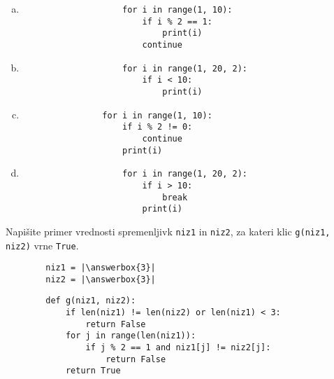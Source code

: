 \documentclass[arhiv, 10pt]{../izpit}
\newcommand{\inlinepy}[1]{\texttt{#1}}
\newcommand{\answerbox}[1]{\framebox{\vphantom{\large M}\hspace{#1cm}}}
\begin{document}
        \begin{multicols}{2}
        \begin{enumerate}[(a)]
\item 
                \begin{verbatim}
                    for i in range(1, 10):
                        if i % 2 == 1:
                            print(i)
                        continue
                \end{verbatim}
            
\item 
                \begin{verbatim}
                    for i in range(1, 20, 2):
                        if i < 10:
                            print(i)
                \end{verbatim}
            
\item 
            \begin{verbatim}
                for i in range(1, 10):
                    if i % 2 != 0:
                        continue
                    print(i)
            \end{verbatim}
        
\item 
                \begin{verbatim}
                    for i in range(1, 20, 2):
                        if i > 10:
                            break
                        print(i)
                \end{verbatim}
            
\end{enumerate}

        \end{multicols}
    
        \naloga*
        \begin{multicols}{2}
        \noindent
        Napišite primer vrednosti spremenljivk \inlinepy{niz1} in \inlinepy{niz2}, za kateri klic \inlinepy{g(niz1, niz2)} vrne \inlinepy{True}.
        \begin{verbatim}
        niz1 = |\answerbox{3}|
        niz2 = |\answerbox{3}|
        \end{verbatim}
        \vfil
        \columnbreak
        \begin{verbatim}
        def g(niz1, niz2):
            if len(niz1) != len(niz2) or len(niz1) < 3:
                return False
            for j in range(len(niz1)):
                if j % 2 == 1 and niz1[j] != niz2[j]:
                    return False
            return True
        \end{verbatim}
        \end{multicols}
    
\end{document}
